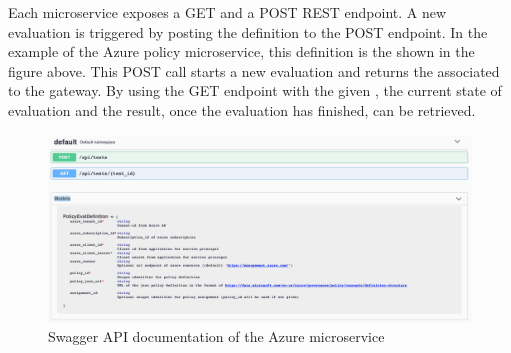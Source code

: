 Each microservice exposes a GET and a POST REST endpoint. A new evaluation is triggered by posting the definition to the POST endpoint. In the example of the Azure policy microservice, this definition is the  shown in the figure above. This POST call starts a new evaluation and returns the associated  to the gateway.
By using the GET endpoint with the given , the current state of evaluation and the result, once the evaluation has finished, can be retrieved.

\begin{figure}[ht!]
\begin{center}
\includegraphics[width=17cm]{swagger_api_azure.png}
\end{center}
\caption[Swagger API documentation of the Azure microservice]{Swagger API documentation of the Azure microservice}
\end{figure}